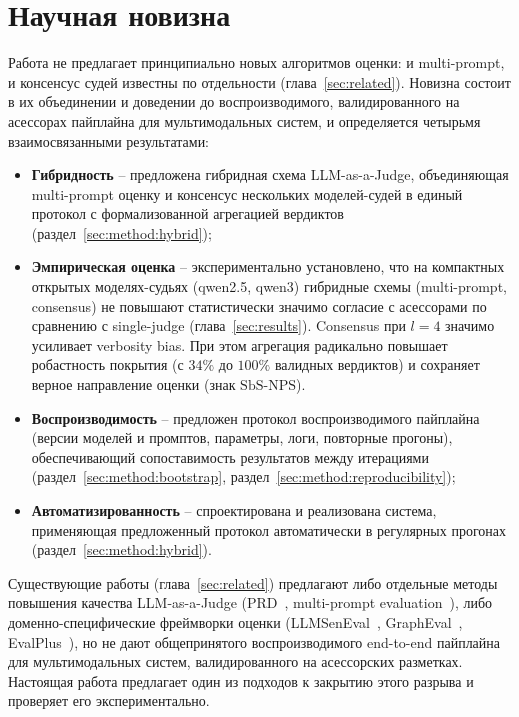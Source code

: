 \section{Научная новизна}
\label{sec:intro:novelty}

Работа не предлагает принципиально новых алгоритмов оценки: и
multi-prompt, и консенсус судей известны по отдельности
(глава~\ref{sec:related}).
Новизна состоит в их объединении и доведении до воспроизводимого,
валидированного на асессорах пайплайна для мультимодальных систем, и
определяется четырьмя взаимосвязанными результатами:

\begin{itemize}
    \item \textbf{Гибридность} -- предложена гибридная схема
        LLM-as-a-Judge, объединяющая multi-prompt оценку и консенсус
        нескольких моделей-судей в единый протокол с формализованной
        агрегацией вердиктов (раздел~\ref{sec:method:hybrid});
    \item \textbf{Эмпирическая оценка} -- экспериментально установлено, что на компактных открытых моделях-судьях (qwen2.5, qwen3) гибридные схемы (multi-prompt, consensus) не повышают статистически значимо согласие с асессорами по сравнению с single-judge (глава~\ref{sec:results}). Consensus при $l=4$ значимо усиливает verbosity bias. При этом агрегация радикально повышает робастность покрытия (с $34\%$ до $100\%$ валидных вердиктов) и сохраняет верное направление оценки (знак $\mathrm{SbS\text{-}NPS}$).
    \item \textbf{Воспроизводимость} -- предложен протокол
        воспроизводимого пайплайна (версии моделей и промптов,
        параметры, логи, повторные прогоны), обеспечивающий
        сопоставимость результатов между итерациями
        (раздел~\ref{sec:method:bootstrap},
        раздел~\ref{sec:method:reproducibility});
    \item \textbf{Автоматизированность} -- спроектирована и реализована
        система, применяющая предложенный протокол автоматически в
        регулярных прогонах (раздел~\ref{sec:method:hybrid}).
\end{itemize}

Существующие работы (глава~\ref{sec:related}) предлагают либо отдельные
методы повышения качества LLM-as-a-Judge (PRD~\cite{li2023prd},
multi-prompt evaluation~\cite{mizrahi2024stateofwhatart}), либо
доменно-специфические фреймворки оценки
(LLMSenEval~\cite{yan2025llmsemeval}, GraphEval~\cite{sansford2024grapheval},
EvalPlus~\cite{liu2023evalplus}), но не дают общепринятого
воспроизводимого end-to-end пайплайна для мультимодальных систем,
валидированного на асессорских разметках.
Настоящая работа предлагает один из подходов к закрытию этого разрыва и
проверяет его экспериментально.

